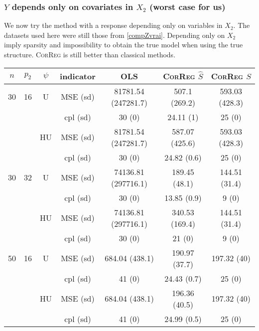 \documentclass[11pt,a4paper]{article}
\begin{document}
\clearpage
	\subsubsection{$Y$ depends only on covariates in $X_2$ (worst case for us)}	 \label{tableMSEsimgauche}
We now try the method with a response depending only on variables in $X_2$. The datasets used here were still those from \ref{compZvrai}.
Depending only on $X_2$ imply sparsity and impossibility to obtain the true model when using the true structure. \textsc{CorReg} is still better than classical methods. 

\begin{table}[h!]
\centering
\begin{tabular}{|c|c|c|c|c|c|c|}
\hline 
$n$ & $p_2$&  $\psi$ &indicator &OLS  &    \textsc{CorReg} $\hat S$& \textsc{CorReg} $S$\\ 
\hline %
30 & 16 & U&MSE (sd) & 81781.54 (247281.7) & 507.1 (269.2) & 593.03 (428.3) \\
& & & cpl (sd) & 30 (0) & 24.11 (1) & 25 (0) \\
 &  &HU &MSE (sd) & 81781.54 (247281.7) & 587.07 (425.6) & 593.03 (428.3) \\
& & & cpl (sd) & 30 (0) & 24.82 (0.6) & 25 (0) \\
\hline %
30 & 32 & U & MSE (sd) & 74136.81 (297716.1) & 189.45 (48.1) & 144.51 (31.4) \\
& & & cpl (sd) & 30 (0) & 13.85 (0.9) & 9 (0) \\
 &  & HU & MSE (sd) & 74136.81 (297716.1) & 340.53 (169.4) & 144.51 (31.4) \\
& & & cpl (sd) & 30 (0) & 21 (0) & 9 (0) \\
\hline
\hline %
50 & 16 & U&	MSE (sd) & 684.04 (438.1) & 190.97 (37.7) & 197.32 (40) \\
& & & cpl (sd) & 41 (0) & 24.43 (0.7) & 25 (0) \\
 &  &HU &MSE (sd) & 684.04 (438.1) & 196.36 (40.5) & 197.32 (40) \\
& & & cpl (sd) & 41 (0) & 24.99 (0.5) & 25 (0) \\

\end{tabular}
\end{table}
\end{document}
